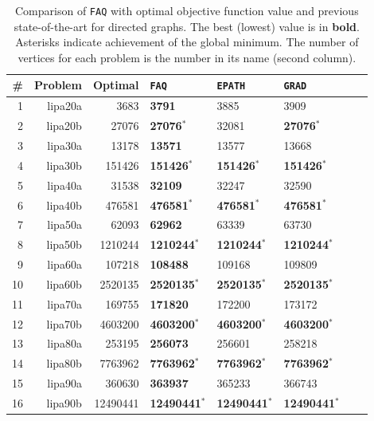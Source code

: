 \documentclass[11pt]{article}
\newcommand{\FAQ}{\texttt{FAQ} }
\begin{document}
\begin{table}[h!]
\caption{Comparison of \FAQ with optimal objective function value and previous state-of-the-art for directed graphs.  The best (lowest) value is in \textbf{bold}. Asterisks indicate achievement of the global minimum.  The number of vertices for each problem is the number in its name (second column).}
\begin{center}
\begin{tabular}{|r|r|r||l|l|l|l|l|}
	\hline 
	          \# &  Problem &      Optimal & \texttt{FAQ} & \texttt{EPATH} & \texttt{GRAD} \\
	\hline 
	           1 &  lipa20a &     3683 & \textbf{3791} &     3885 &     3909 \\ 
	           2 &  lipa20b &    27076 & \textbf{27076}$^*$ &    32081 &    \textbf{27076}$^*$ \\ 
	           3 &  lipa30a &    13178 & \textbf{13571} 	&    13577 &    13668 \\ 
	           4 &  lipa30b &   151426 & \textbf{151426}$^*$ & \textbf{151426}$^*$ &   \textbf{151426}$^*$ \\ 
	           5 &  lipa40a &    31538 & \textbf{32109} 	&    32247 &    32590 \\ 
	           6 &  lipa40b &   476581 & \textbf{476581}$^*$ &   \textbf{476581}$^*$ &   \textbf{476581}$^*$ \\ 
	           7 &  lipa50a &    62093 & \textbf{62962} &    63339 &    63730 \\ 
	           8 &  lipa50b &  1210244 & \textbf{1210244}$^*$ &  \textbf{1210244}$^*$ &  \textbf{1210244}$^*$ \\ 
	           9 &  lipa60a &   107218 & \textbf{108488} &   109168 &   109809 \\ 
	          10 &  lipa60b &  2520135 & \textbf{2520135}$^*$ &  \textbf{2520135}$^*$ &  \textbf{2520135}$^*$ \\ 
	          11 &  lipa70a &   169755 & \textbf{171820} &   172200 &   173172 \\ 
	          12 &  lipa70b &  4603200 & \textbf{4603200}$^*$ &  \textbf{4603200}$^*$ &  \textbf{4603200}$^*$ \\ 
	          13 &  lipa80a &   253195 & \textbf{256073} &   256601 &   258218 \\ 
	          14 &  lipa80b &  7763962 & \textbf{7763962}$^*$ &  \textbf{7763962}$^*$ &  \textbf{7763962}$^*$ \\ 
	          15 &  lipa90a &   360630 & \textbf{363937} &   365233 &   366743 \\ 
	          16 &  lipa90b & 12490441 & \textbf{12490441}$^*$ & \textbf{12490441}$^*$ & \textbf{12490441}$^*$ \\ 
	\hline
	\end{tabular}
\end{center}
\label{tab:directed}
\end{table}%
\end{document}

